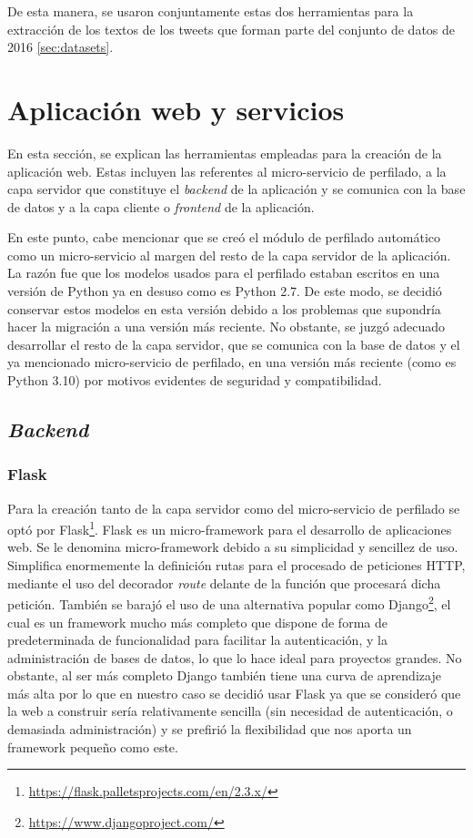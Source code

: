 De esta manera, se usaron conjuntamente estas dos herramientas para la extracción de los textos de los tweets que forman parte del conjunto de datos de 2016 \ref{sec:datasets}.

\section{Aplicación web y servicios}

En esta sección, se explican las herramientas empleadas para la creación de la aplicación web. Estas incluyen las referentes al micro-servicio de perfilado, a la capa servidor que constituye el \textit{backend} de la aplicación y se comunica con la base de datos y a la capa cliente o \textit{frontend} de la aplicación.

En este punto, cabe mencionar que se creó el módulo de perfilado automático como un micro-servicio al margen del resto de la capa servidor de la aplicación. La razón fue que los modelos usados para el perfilado estaban escritos en una versión de Python ya en desuso como es Python 2.7. De este modo, se decidió conservar estos modelos en esta versión debido a los problemas que supondría hacer la migración a una versión más reciente. No obstante, se juzgó adecuado desarrollar el resto de la capa servidor, que se comunica con la base de datos y el ya mencionado micro-servicio de perfilado, en una versión más reciente (como es Python 3.10) por motivos evidentes de seguridad y compatibilidad.

\subsection{\textit{Backend}}

\subsubsection{Flask}

Para la creación tanto de la capa servidor como del micro-servicio de perfilado se optó por Flask\footnote{\url{https://flask.palletsprojects.com/en/2.3.x/}}. Flask es un micro-framework para el desarrollo de aplicaciones web. Se le denomina micro-framework debido a su simplicidad y sencillez de uso. Simplifica enormemente la definición rutas para el procesado de peticiones HTTP, mediante el uso del decorador \textit{route} delante de la función que procesará dicha petición.
También se barajó el uso de una alternativa popular como Django\footnote{\url{https://www.djangoproject.com/}}, el cual es un framework mucho más completo que dispone de forma de predeterminada de funcionalidad para facilitar la autenticación, y la administración de bases de datos, lo que lo hace ideal para proyectos grandes. No obstante, al ser más completo Django también tiene una curva de aprendizaje más alta por lo que en nuestro caso se decidió usar Flask ya que se consideró que la web a construir sería relativamente sencilla (sin necesidad de autenticación, o demasiada administración) y se prefirió la flexibilidad que nos aporta un framework pequeño como este.

